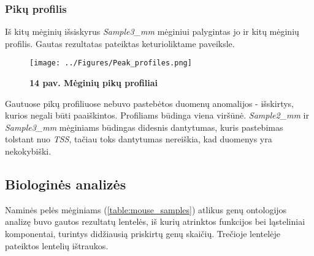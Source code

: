 \documentclass[12pt]{article}
\begin{document}
\newpage

\subsubsection*{Pikų profilis}
Iš kitų mėginių išsiskyrus \emph{Sample3\_mm} mėginiui palygintas jo ir kitų
mėginių profilis. Gautas rezultatas pateiktas keturioliktame paveiksle.

\begin{figure}[ht]
    \begin{center}
        \captionsetup{justification=centering}
        \texttt{[image: ../Figures/Peak\_profiles.png]}
        \vspace{-1.5\baselineskip}
        \caption*{\small\textbf{14 pav. Mėginių pikų profiliai}}
    \end{center}
\end{figure}

Gautuose pikų profiliuose nebuvo pastebėtos duomenų anomalijos - išskirtys,
kurios negali būti paaiškintos. Profiliams būdinga viena viršūnė.
\emph{Sample2\_mm} ir \emph{Sample3\_mm} mėginiams būdingas didesnis dantytumas,
kuris pastebimas tolstant nuo \emph{TSS}, tačiau toks dantytumas nereiškia, kad
duomenys yra nekokybiški.

\newpage

\subsection*{Biologinės analizės}
Naminės pelės mėginiams (\ref{table:mouse_samples}) atlikus genų ontologijos
analizę buvo gautos rezultatų lentelės, iš kurių atrinktos funkcijos bei
ląsteliniai komponentai, turintys didžiausią priskirtų genų skaičių. Trečioje
lentelėje pateiktos lentelių ištraukos.
\end{document}
